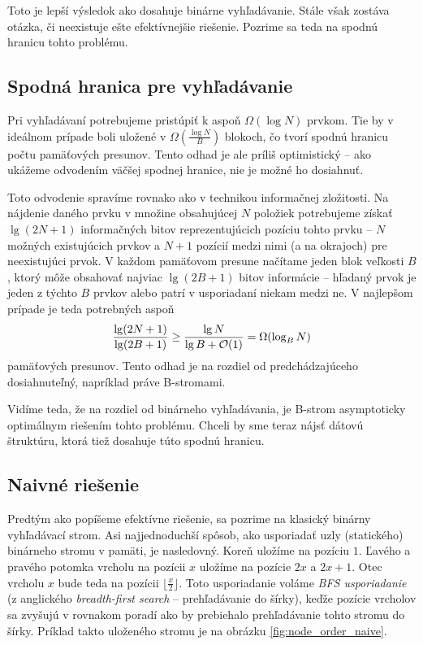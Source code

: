Toto je lepší výsledok ako dosahuje binárne vyhľadávanie. Stále však zostáva otázka, či neexistuje  ešte efektívnejšie riešenie. Pozrime sa teda na spodnú hranicu tohto problému.

\subsection{Spodná hranica pre vyhľadávanie} \label{sec:tree-lowerbound}
Pri vyhľadávaní potrebujeme pristúpiť k aspoň $\Omega(\log{N})$ prvkom. Tie by v ideálnom prípade boli uložené v $\Omega(\frac{\log{N}}{B})$ blokoch, čo tvorí spodnú hranicu počtu pamäťových presunov. Tento odhad je ale príliš optimistický -- ako ukážeme odvodením väčšej spodnej hranice, nie je možné ho dosiahnuť.

Toto odvodenie spravíme rovnako ako v \citep{demaineoverview} technikou informačnej zložitosti. Na nájdenie daného prvku v množine obsahujúcej $N$ položiek potrebujeme získať $\lg(2N+1)$ informačných bitov reprezentujúcich pozíciu tohto prvku -- $N$ možných existujúcich prvkov a $N+1$ pozícií medzi nimi (a na okrajoch) pre neexistujúci prvok. V každom pamäťovom presune načítame jeden blok veľkosti $B$, ktorý môže obsahovať najviac $\lg(2B+1)$ bitov informácie -- hľadaný prvok je jeden z týchto $B$ prvkov alebo patrí v usporiadaní niekam medzi ne. V najlepšom prípade je teda potrebných aspoň
\[
\frac{\lg(2N+1)}{\lg(2B+1)} \ge \frac{\lg N}{\lg B+\mathcal{O}(1)} = \Omega(\log_B{N})
\]
pamäťových presunov. Tento odhad je na rozdiel od predchádzajúceho dosiahnuteľný, napríklad práve \aware B-stromami.

Vidíme teda, že na rozdiel od \obliv binárneho vyhľadávania, je \aware B-strom asymptoticky optimálnym riešením tohto problému. Chceli by sme teraz nájsť \obliv dátovú štruktúru, ktorá tiež dosahuje túto spodnú hranicu.

\subsection{Naivné \obliv riešenie} \label{sec:static-naive}
Predtým ako popíšeme efektívne \obliv riešenie, sa pozrime na klasický binárny vyhľadávací strom. Asi najjednoduchší spôsob, ako usporiadať uzly (statického) binárneho stromu v pamäti, je nasledovný. Koreň uložíme na pozíciu $1$. Ľavého a pravého potomka vrcholu na pozícii $x$ uložíme na pozície $2x$ a $2x+1$. Otec vrcholu $x$ bude teda na pozícii $\lfloor\frac{x}{2}\rfloor$. Toto usporiadanie voláme \emph{BFS usporiadanie} (z anglického \emph{breadth-first search} -- prehľadávanie do šírky), keďže pozície vrcholov sa zvyšujú v rovnakom poradí ako by prebiehalo prehľadávanie tohto stromu do šírky. Príklad takto uloženého stromu je na obrázku \ref{fig:node_order_naive}.

